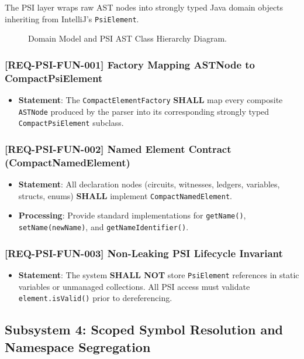 The PSI layer wraps raw AST nodes into strongly typed Java domain objects inheriting from IntelliJ's \texttt{PsiElement}.

\begin{figure}[htbp]
    \centering
    
    \caption{Domain Model and PSI AST Class Hierarchy Diagram.}
    \label{fig:class_model_diagram}
\end{figure}

\subsubsection{[REQ-PSI-FUN-001] Factory Mapping ASTNode to CompactPsiElement}
\begin{itemize}
    \item \textbf{Statement}: The \texttt{CompactElementFactory} \textbf{SHALL} map every composite \texttt{ASTNode} produced by the parser into its corresponding strongly typed \texttt{CompactPsiElement} subclass.
\end{itemize}

\subsubsection{[REQ-PSI-FUN-002] Named Element Contract (CompactNamedElement)}
\begin{itemize}
    \item \textbf{Statement}: All declaration nodes (circuits, witnesses, ledgers, variables, structs, enums) \textbf{SHALL} implement \texttt{CompactNamedElement}.
    \item \textbf{Processing}: Provide standard implementations for \texttt{getName()}, \texttt{setName(newName)}, and \texttt{getNameIdentifier()}.
\end{itemize}

\subsubsection{[REQ-PSI-FUN-003] Non-Leaking PSI Lifecycle Invariant}
\begin{itemize}
    \item \textbf{Statement}: The system \textbf{SHALL NOT} store \texttt{PsiElement} references in static variables or unmanaged collections. All PSI access must validate \texttt{element.isValid()} prior to dereferencing.
\end{itemize}

\subsection{Subsystem 4: Scoped Symbol Resolution and Namespace Segregation}
\label{sec:subsystem_resolution}

